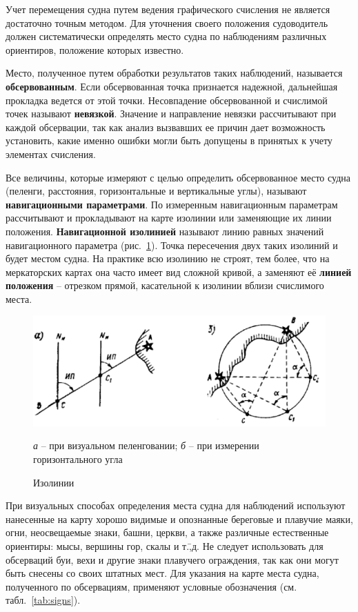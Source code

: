 \documentclass[a4paper, 12pt, twoside, final, book, russian, fittopage, cyremdash]{ncc}
\newcommand{\ris}[1]{\ref{fig:#1}}
\begin{document}
Учет перемещения судна путем ведения графического счисления не является достаточно точным методом. Для уточнения своего положения судоводитель должен систематически определять место судна по наблюдениям различных ориентиров, положение которых известно. 

Место, полученное путем обработки результатов таких наблюдений, называется \textbf{обсервованным}. Если обсервованная точка признается надежной, дальнейшая прокладка ведется от этой точки. Несовпадение обсервованной и счислимой точек называют \textbf{невязкой}. Значение и направление невязки рассчитывают при каждой обсервации, так как анализ вызвавших ее причин дает возможность установить, какие именно ошибки могли быть допущены в принятых к учету элементах счисления. 

Все величины, которые измеряют с целью определить обсервованное место судна (пеленги, расстояния, горизонтальные и вертикальные углы), называют \textbf{навигационными параметрами}. По измеренным навигационным параметрам рассчитывают и прокладывают на карте изолинии или заменяющие их линии положения. \textbf{Навигационной изолинией} называют линию равных значений навигационного параметра (рис.~\ris{N40}). Точка пересечения двух таких изолиний и будет местом судна. На практике всю изолинию не строят, тем более, что на меркаторских картах она часто имеет вид сложной кривой, а заменяют её \textbf{линией положения} \--- отрезком прямой, касательной к изолинии вблизи счислимого места. 

\begin{figure}[htb]
  \centering{}
  \includegraphics{N040}
  \caption{Изолинии}
  \label{fig:N40}
  \small
  \centering{}
  \textit{а} \--- при визуальном пеленговании; \textit{б} \--- при измерении горизонтального угла
\end{figure}

При визуальных способах определения места судна для наблюдений используют нанесенные на карту хорошо видимые и опознанные береговые и плавучие маяки, огни, неосвещаемые знаки, башни, церкви, а также различные естественные ориентиры: мысы, вершины гор, скалы и т.\=,д. Не следует использовать для обсерваций буи, вехи и другие знаки плавучего ограждения, так как они могут быть снесены со своих штатных мест. Для указания на карте места судна, полученного по обсервациям, применяют условные обозначения (см. табл.~\ref{tab:signs}).
\end{document}
